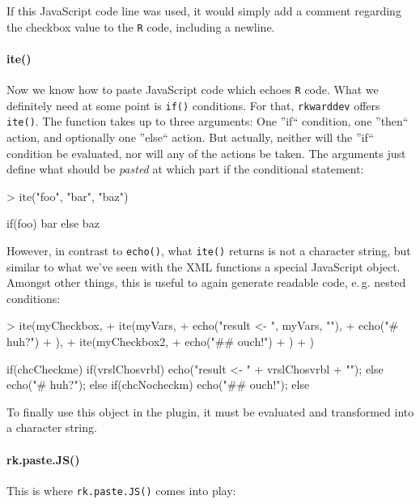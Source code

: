 \documentclass[a4paper,10pt]{scrartcl}
\begin{document}
If this JavaScript code line was used, it would simply add a comment regarding the checkbox value to the \texttt{R} code,
including a newline.

\paragraph{ite()}
Now we know how to paste JavaScript code which echoes \texttt{R} code. What we definitely need at some point is \texttt{if()} conditions. For
that, \texttt{rkwarddev} offers \texttt{ite()}. The function takes up to three arguments: One ''if`` condition, one ''then`` action, and optionally
one ''else`` action. But actually, neither will the ''if`` condition be evaluated, nor will any of the actions be taken. The arguments just
define what should be \textit{pasted} at which part if the conditional statement:

	\begin{Schunk}
		\begin{Sinput}
> ite("foo", "bar", "baz")
		\end{Sinput}
		\begin{Soutput}
  if(foo) {
    bar
  } else {
    baz
  }
		\end{Soutput}
	\end{Schunk}

However, in contrast to \texttt{echo()}, what \texttt{ite()} returns is not a character string, but similar to what we've seen with the XML
functions a special JavaScript object. Amongst other things, this is useful to again generate readable code, e.\,g. nested conditions:

	\begin{Schunk}
		\begin{Sinput}
> ite(myCheckbox,
+   ite(myVars,
+     echo("result <- ", myVars, "\n"),
+     echo("# huh?\n")
+   ),
+   ite(myCheckbox2,
+     echo("## ouch!\n")
+   )
+ )
		\end{Sinput}
		\begin{Soutput}
  if(chcCheckme) {
    if(vrslChosvrbl) {
      echo("result <- " + vrslChosvrbl + "\n");
    } else {
      echo("# huh?\n");
    }
  } else if(chcNocheckm) {
    echo("## ouch!\n");
  } else {}
		\end{Soutput}
	\end{Schunk}

To finally use this object in the plugin, it must be evaluated and transformed into a character string.

\paragraph{rk.paste.JS()}
This is where \texttt{rk.paste.JS()} comes into play:
\end{document}
